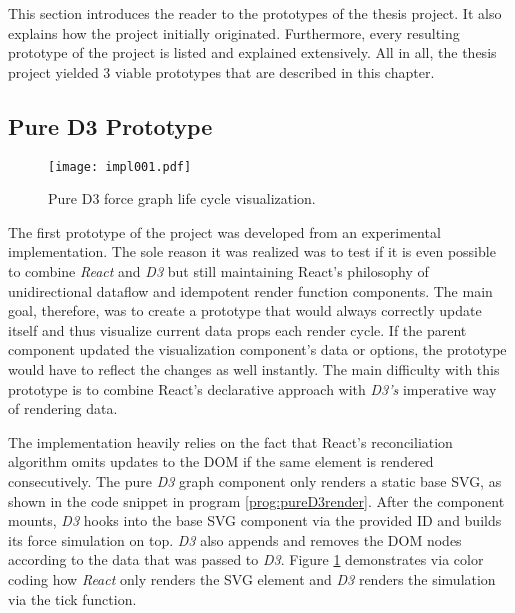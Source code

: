 This section introduces the reader to the prototypes of the thesis project. It also explains how the project initially originated. Furthermore, every resulting prototype of the project is listed and explained extensively. All in all, the thesis project yielded 3 viable prototypes that are described in this chapter. 


\subsection{Pure D3 Prototype}
\label{sec:pureD3prototype}

\begin{figure}
\centering
\texttt{[image: impl001.pdf]}
\caption{Pure D3 force graph life cycle visualization.}
\label{fig:pureD3Lifecycle}
\end{figure}

The first prototype of the project was developed from an experimental implementation. The sole reason it was realized was to test if it is even possible to combine \emph{React} and \emph{D3} but still maintaining React's philosophy of unidirectional dataflow and idempotent render function components. The main goal, therefore, was to create a prototype that would always correctly update itself and thus visualize current data props each render cycle. If the parent component updated the visualization component's data or options, the prototype would have to reflect the changes as well instantly. The main difficulty with this prototype is to combine React's declarative approach with \emph{D3's} imperative way of rendering data.

The implementation heavily relies on the fact that React's reconciliation algorithm omits updates to the DOM if the same element is rendered consecutively. The pure \emph{D3} graph component only renders a static base SVG, as shown in the code snippet in program \ref{prog:pureD3render}. After the component mounts, \emph{D3} hooks into the base SVG component via the provided ID and builds its force simulation on top. \emph{D3} also appends and removes the DOM nodes according to the data that was passed to \emph{D3}. Figure \ref{fig:pureD3Lifecycle} demonstrates via color coding how \emph{React} only renders the SVG element and \emph{D3} renders the simulation via the tick function.

